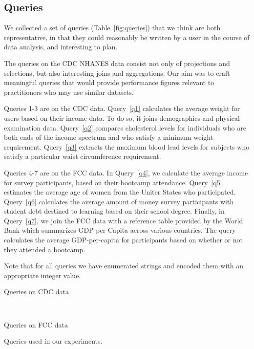 \subsection{Queries}
We collected a set of queries (Table~\ref{fig:queries}) that we think are both representative, in that they could reasonably be written by a user in the course of data analysis, and interesting to plan.

The queries on the CDC NHANES data consist not only of projections and selections,
but also interesting joins and aggregations. Our aim was to craft meaningful queries
that would provide performance figures relevant to practitioners who may use
similar datasets.

Queries 1-3 are on the CDC data. Query~\ref{q1} calculates the average weight for users based on their income data.
To do so, it joins demographics and physical examination data. Query~\ref{q2}
compares cholesterol levels for individuals who are both ends of the income
spectrum and who satisfy a minimum weight requirement. Query~\ref{q3}
extracts the maximum blood lead levels for subjects who satisfy a particular
waist circumference requirement.

Queries 4-7 are on the FCC data. In Query~\ref{q4}, we calculate the average income for survey participants,
based on their bootcamp attendance. Query~\ref{q5} estimates the average
age of women from the Uniter States who participated. Query~\ref{q6} 
calculates the average amount of money survey participants with student debt destined to
learning based on their school degree. Finally, in Query~\ref{q7}, we join the FCC data with a reference table provided
by the World Bank which summarizes GDP per Capita across various
countries\cite{worldbank-data}. The query calculates the average GDP-per-capita for participants based on whether or not they
attended a bootcamp. 

Note that for all queries we have enumerated strings and encoded them with
an appropriate integer value.

\begin{table*}
\centering
 \begin{subtable}{\linewidth}
  
  \caption{Queries on CDC data}
  \label{fig:queries-cdc}
 \end{subtable}
 ~
 \begin{subtable}{\linewidth}
 
 \caption{Queries on FCC data}
 \label{fig:queries-fcc}
 \end{subtable}
  \caption{Queries used in our experiments.}
  \label{fig:queries}
\end{table*}

